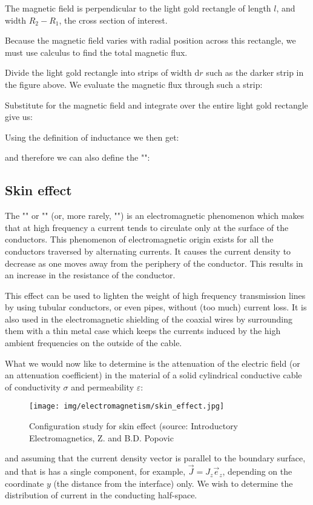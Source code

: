  	The magnetic field is perpendicular to the light gold rectangle of length $l$, and width $R_2-R_1$, the cross section of interest.

	Because the magnetic field varies with radial position across this rectangle, we must use calculus to find the total magnetic flux.
	
	Divide the light gold rectangle into strips of width $\mathrm{d}r$ such as the darker strip in the figure above. We evaluate the magnetic flux through such a strip:
	
	Substitute for the magnetic field and integrate over the entire light gold rectangle give us:
	
	Using the definition of inductance we then get:
	
	and therefore we can also define the "\label{coaxial inductance per unit length}":
	
	
	\pagebreak
	\subsection{Skin effect}
	The "" or "" (or, more rarely, "") is an electromagnetic phenomenon which makes that at high frequency a current tends to circulate only at the surface of the conductors. This phenomenon of electromagnetic origin exists for all the conductors traversed by alternating currents. It causes the current density to decrease as one moves away from the periphery of the conductor. This results in an increase in the resistance of the conductor.

	This effect can be used to lighten the weight of high frequency transmission lines by using tubular conductors, or even pipes, without (too much) current loss. It is also used in the electromagnetic shielding of the coaxial wires by surrounding them with a thin metal case which keeps the currents induced by the high ambient frequencies on the outside of the cable.
	
	What we would now like to determine is the attenuation of the electric field (or an attenuation coefficient) in the material of a solid cylindrical conductive cable of conductivity $\sigma$ and permeability $\varepsilon$:
	\begin{figure}[H]
		\centering
		\texttt{[image: img/electromagnetism/skin\_effect.jpg]}
		\caption[Configuration study for skin effect]{Configuration study for skin effect (source: Introductory Electromagnetics, Z. and B.D. Popovic}
	\end{figure}
	and assuming that the current density vector is parallel to the boundary surface, and that is has a single component, for example, $\vec{J}=J_z\vec{e}_z$, depending on the coordinate $y$ (the distance from the interface) only. We wish to determine the distribution of current in the conducting half-space.
	
